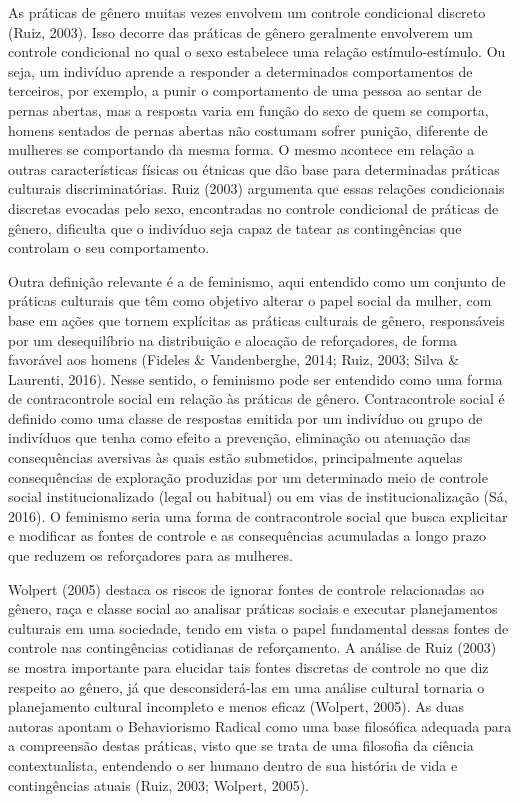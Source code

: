 As práticas de gênero muitas vezes envolvem um controle condicional discreto (Ruiz, 2003). Isso decorre das práticas de gênero geralmente envolverem um controle condicional no qual o sexo estabelece uma relação estímulo-estímulo. Ou seja, um indivíduo aprende a responder a determinados comportamentos de terceiros, por exemplo, a punir o comportamento de uma pessoa ao sentar de pernas abertas, mas a resposta varia em função do sexo de quem se comporta, homens sentados de pernas abertas não costumam sofrer punição, diferente de mulheres se comportando da mesma forma. O mesmo acontece em relação a outras características físicas ou étnicas que dão base para determinadas práticas culturais discriminatórias. Ruiz (2003) argumenta que essas relações condicionais discretas evocadas pelo sexo, encontradas no controle condicional de práticas de gênero, dificulta que o indivíduo seja capaz de tatear as contingências que controlam o seu comportamento. 

Outra definição relevante é a de feminismo, aqui entendido como um conjunto de práticas culturais que têm como objetivo alterar o papel social da mulher, com base em ações que tornem explícitas as práticas culturais de gênero, responsáveis por um desequilíbrio na distribuição e alocação de reforçadores, de forma favorável aos homens (Fideles \& Vandenberghe, 2014; Ruiz, 2003; Silva \& Laurenti, 2016). Nesse sentido, o feminismo pode ser entendido como uma forma de contracontrole social em relação às práticas de gênero. Contracontrole social é definido como uma classe de respostas emitida por um indivíduo ou grupo de indivíduos que tenha como efeito a prevenção, eliminação ou atenuação das consequências aversivas às quais estão submetidos, principalmente aquelas consequências de exploração produzidas por um determinado meio de controle social institucionalizado (legal ou habitual) ou em vias de institucionalização (Sá, 2016). O feminismo seria uma forma de contracontrole social que busca explicitar e modificar as fontes de controle e as consequências acumuladas a longo prazo que reduzem os reforçadores para as mulheres.

Wolpert (2005) destaca os riscos de ignorar fontes de controle relacionadas ao gênero, raça e classe social ao analisar práticas sociais e executar planejamentos culturais em uma sociedade, tendo em vista o papel fundamental dessas fontes de controle nas contingências cotidianas de reforçamento. A análise de Ruiz (2003) se mostra importante para elucidar tais fontes discretas de controle no que diz respeito ao gênero, já que desconsiderá-las em uma análise cultural tornaria o planejamento cultural incompleto e menos eficaz (Wolpert, 2005). As duas autoras apontam o Behaviorismo Radical como uma base filosófica adequada para a compreensão destas práticas, visto que se trata de uma filosofia da ciência contextualista, entendendo o ser humano dentro de sua história de vida e contingências atuais (Ruiz, 2003; Wolpert, 2005).

